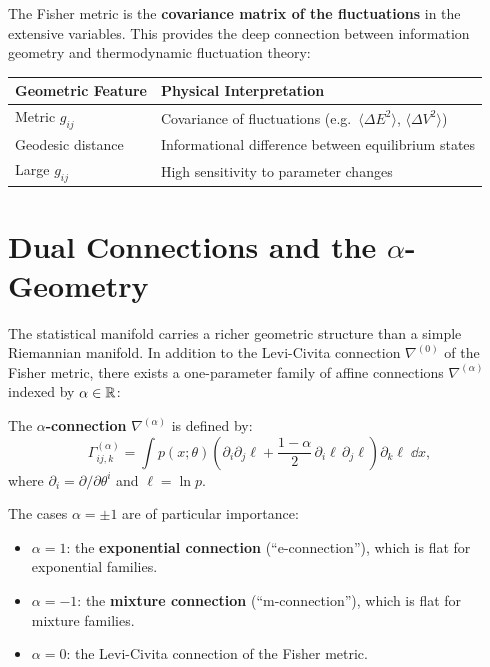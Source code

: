 The Fisher metric is the \textbf{covariance matrix of the fluctuations} in the extensive variables. This provides the deep connection between information geometry and thermodynamic fluctuation theory:

\begin{table}[H]
\centering
\renewcommand{\arraystretch}{1.6}
\begin{tabular}{ll}
\toprule
\textbf{Geometric Feature} & \textbf{Physical Interpretation} \\
\midrule
Metric $g_{ij}$ & Covariance of fluctuations (e.g.\ $\langle \Delta E^2\rangle$, $\langle \Delta V^2\rangle$) \\
Geodesic distance & Informational difference between equilibrium states \\
Large $g_{ij}$ & High sensitivity to parameter changes \\
\bottomrule
\end{tabular}
\end{table}

\section{Dual Connections and the $\alpha$-Geometry}

The statistical manifold carries a richer geometric structure than a simple Riemannian manifold. In addition to the Levi-Civita connection $\nabla^{(0)}$ of the Fisher metric, there exists a one-parameter family of affine connections $\nabla^{(\alpha)}$ indexed by $\alpha \in \mathbb{R}$:

\begin{definition}
The \textbf{$\alpha$-connection} $\nabla^{(\alpha)}$ is defined by:
\begin{equation}
\Gamma_{ij,k}^{(\alpha)} = \int p(x;\theta)\left(\partial_i\partial_j\ell + \frac{1-\alpha}{2}\,\partial_i\ell\,\partial_j\ell\right)\partial_k\ell\;\dd x,
\end{equation}
where $\partial_i = \partial/\partial\theta^i$ and $\ell = \ln p$.
\end{definition}

The cases $\alpha = \pm 1$ are of particular importance:
\begin{itemize}
\item $\alpha = 1$: the \textbf{exponential connection} (``e-connection''), which is flat for exponential families.
\item $\alpha = -1$: the \textbf{mixture connection} (``m-connection''), which is flat for mixture families.
\item $\alpha = 0$: the Levi-Civita connection of the Fisher metric.
\end{itemize}

